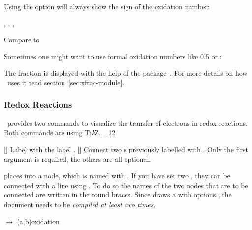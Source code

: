 \documentclass[load-preamble+]{cnltx-doc}
\makeatletter
\newcommand*\TikZ{Ti\textit{k}Z}
\renewenvironment{commands}
  {%
    \cnltx@set@catcode_{12}%
    \let\command\cnltx@command
    \cnltxlist
  }
  {\endcnltxlist}
\makeatother
\begin{document}
Using the  option will always show the sign of the
oxidation number:
\begin{example}
  , , , 
\end{example}

\begin{example}
  Compare  to 
\end{example}

Sometimes one might want to use formal oxidation numbers like \num{.5} or
:
\begin{example}

\end{example}

The fraction is displayed with the help of the 
package~\cite{bnd:l3packages}.  For more details on how \chemmacros\ uses it
read section~\vref{sec:xfrac-module}.

\subsubsection{Redox Reactions}\label{sec:redox-reactions}

\chemmacros\ provides two commands to visualize the transfer of electrons in
redox reactions.  Both commands are using \TikZ.
\begin{commands}
  \command{OX}[]
    Label  with the label .
  \command{redox}[]
    Connect two s previously labelled with .  Only the first
    argument  is required, the others are all
    optional.
\end{commands}

 places  into a node, which is named with .  If
you have set two , they can be connected with a line using .
To do so the names of the two nodes that are to be connected are written in
the round braces.  Since  draws a  with options
, the document needs to be \emph{compiled at
  least two times}.

\begin{example}
  \vspace{7mm}
   $\rightarrow$ \pch\redox(a,b){oxidation}
\end{example}
\end{document}
